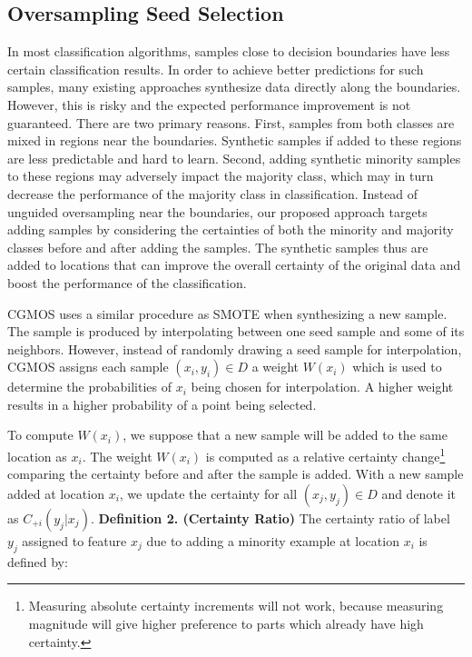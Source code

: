 \documentclass[10pt,journal,compsoc]{IEEEtran}
\begin{document}
\subsection{{Oversampling Seed Selection}}
In most classification algorithms, samples close to decision boundaries have less certain classification results. In order to achieve better predictions for such samples, many existing approaches synthesize data directly along the boundaries. However, this is risky and the expected performance improvement is not guaranteed. There are two primary reasons. First, samples from both classes are mixed in regions near the boundaries. Synthetic samples if added to  these regions are less predictable and hard to learn. Second, adding synthetic minority samples to these regions may adversely impact the majority class, which may in turn decrease the performance of the majority class in classification. Instead of unguided oversampling near the boundaries, our proposed approach targets adding samples by considering the certainties of both the minority and majority classes before and after adding the samples. The synthetic samples thus are added to locations that can improve the overall certainty of the original data and boost the performance of the classification.

CGMOS uses a similar procedure as SMOTE when synthesizing a new sample. The sample is produced by interpolating between one seed sample and some of its neighbors. However, instead of randomly drawing a seed sample for interpolation, CGMOS assigns each sample $(x_i, y_i) \in D$ a weight $W(x_i)$ which is used to determine the probabilities of $x_i$ being chosen for interpolation. A higher weight results in a higher probability of a point being selected.

To compute $W(x_i)$, we suppose that a new sample will be added to the same location as $x_i$. The weight $W(x_i)$ is computed as a relative certainty change\footnote{Measuring absolute certainty increments will not work, because measuring magnitude will give higher preference to parts which already have high certainty.} comparing the certainty before and after the sample is added. With a new sample added at location $x_i$, we update the certainty for all $(x_j, y_j) \in D$ and denote it as $C_{+i}(y_j | x_j)$. 
\newline
\newline
\noindent \textbf{Definition 2. (Certainty Ratio)} The certainty ratio of label $y_j$ assigned to feature $x_j$ due to adding a minority example at location $x_i$ is defined by:
\end{document}
